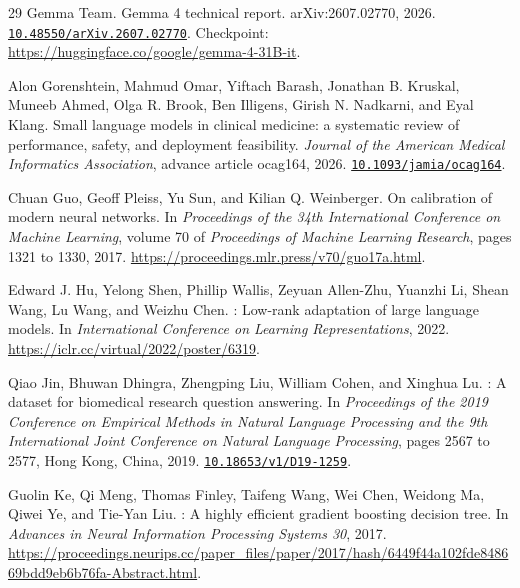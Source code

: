 \documentclass[11pt,letterpaper]{article}
\newcommand{\doi}[1]{\href{https://doi.org/#1}{\nolinkurl{#1}}}
\begin{document}
\begin{thebibliography}{29}
Gemma Team.
\newblock Gemma 4 technical report.
\newblock arXiv:2607.02770, 2026.
\newblock \doi{10.48550/arXiv.2607.02770}. Checkpoint: \url{https://huggingface.co/google/gemma-4-31B-it}.

Alon Gorenshtein, Mahmud Omar, Yiftach Barash, Jonathan B. Kruskal, Muneeb Ahmed, Olga R. Brook, Ben Illigens, Girish N. Nadkarni, and Eyal Klang.
\newblock Small language models in clinical medicine: a systematic review of performance, safety, and deployment feasibility.
\newblock \emph{Journal of the American Medical Informatics Association}, advance article ocag164, 2026.
\newblock \doi{10.1093/jamia/ocag164}.

Chuan Guo, Geoff Pleiss, Yu Sun, and Kilian Q. Weinberger.
\newblock On calibration of modern neural networks.
\newblock In \emph{Proceedings of the 34th International Conference on Machine Learning}, volume 70 of \emph{Proceedings of Machine Learning Research}, pages 1321 to 1330, 2017.
\newblock \url{https://proceedings.mlr.press/v70/guo17a.html}.

Edward J. Hu, Yelong Shen, Phillip Wallis, Zeyuan Allen-Zhu, Yuanzhi Li, Shean Wang, Lu Wang, and Weizhu Chen.
: Low-rank adaptation of large language models.
\newblock In \emph{International Conference on Learning Representations}, 2022.
\newblock \url{https://iclr.cc/virtual/2022/poster/6319}.

Qiao Jin, Bhuwan Dhingra, Zhengping Liu, William Cohen, and Xinghua Lu.
: A dataset for biomedical research question answering.
\newblock In \emph{Proceedings of the 2019 Conference on Empirical Methods in Natural Language Processing and the 9th International Joint Conference on Natural Language Processing}, pages 2567 to 2577, Hong Kong, China, 2019.
\newblock \doi{10.18653/v1/D19-1259}.

Guolin Ke, Qi Meng, Thomas Finley, Taifeng Wang, Wei Chen, Weidong Ma, Qiwei Ye, and Tie-Yan Liu.
: A highly efficient gradient boosting decision tree.
\newblock In \emph{Advances in Neural Information Processing Systems 30}, 2017.
\newblock \url{https://proceedings.neurips.cc/paper_files/paper/2017/hash/6449f44a102fde848669bdd9eb6b76fa-Abstract.html}.


\end{thebibliography}
\end{document}
